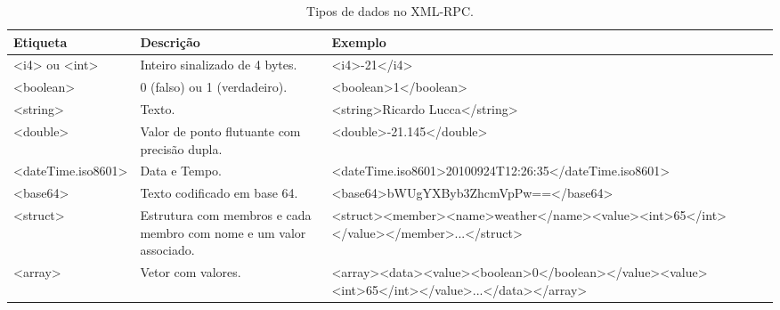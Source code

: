 \begin{table}
	\caption{Tipos de dados no XML-RPC.}
	\label{table-xmlrpc-data}
	\begin{center}
	\begin{tabular}{|p{34mm}|p{50mm}|p{50mm}|}
		\hline
		Etiqueta & Descrição & Exemplo \\ \hline
		<i4> ou <int> & Inteiro sinalizado de 4 bytes. & \scriptsize{<i4>-21</i4>} \\ \hline
		<boolean> & 0 (falso) ou 1 (verdadeiro). & \scriptsize{<boolean>1</boolean>} \\ \hline
		<string> & Texto. & \scriptsize{<string>Ricardo Lucca</string>} \\ \hline
		<double> & Valor de ponto flutuante com precisão dupla. & \scriptsize{<double>-21.145</double>} \\ \hline
		<dateTime.iso8601> & Data e Tempo. & \scriptsize{<dateTime.iso8601>\newline\hspace*{1mm}20100924T12:26:35\newline</dateTime.iso8601>} \\ \hline
		<base64> & Texto codificado em base 64. & \scriptsize{<base64>\newline\hspace*{1mm}bWUgYXByb3ZhcmVpPw==\newline</base64>} \\ \hline
		<struct> & Estrutura com membros e cada membro com nome e um valor associado. & \scriptsize{<struct>\newline\hspace*{1mm}<member>\newline\hspace*{2mm}<name>weather</name>\newline\hspace*{2mm}<value><int>65</int></value>\newline\hspace*{1mm}</member>\newline\hspace*{1mm}...\newline</struct>} \\ \hline
		<array> & Vetor com valores. & \scriptsize{<array><data>\newline\hspace*{1mm}<value><boolean>0</boolean></value>\newline\hspace*{1mm}<value><int>65</int></value>\newline\hspace*{1mm}...\newline</data></array>} \\ \hline
	\end{tabular}
	\end{center}
\end{table}


